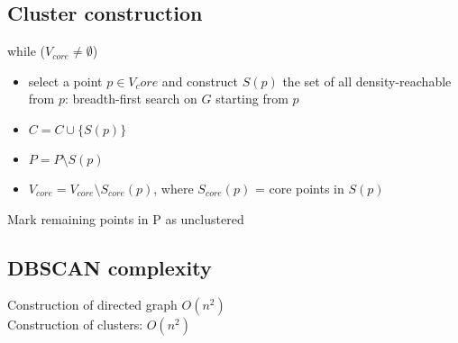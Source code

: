 \subsection{Cluster construction}
while ($ V_{core} \neq \emptyset$)
\begin{itemize}
\item select a point $ p \in V_core $ and construct $S(p)$ the set of
  all density-reachable from $ p $: breadth-first search on $ G $
  starting from $ p $
\item $ C = C \cup \{ S(p) \} $
\item $ P = P \setminus S(p) $
\item $ V_{core} = V_{core} \setminus S_{core} (p) $, where
  $ S_{core}(p) $ = core points in $ S(p) $
\end{itemize}

Mark remaining points in P as unclustered

\subsection{DBSCAN complexity}
Construction of directed graph $ O(n^2) $ \\
Construction of clusters: $ O(n^2) $
